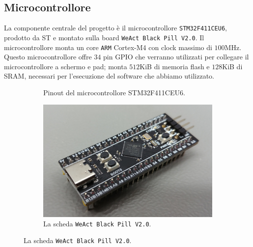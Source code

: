 \documentclass[hidelinks,12pt]{article}
\begin{document}
\subsection{Microcontrollore}
La componente centrale del progetto è il microcontrollore
\texttt{STM32F411CEU6}, prodotto da ST e montato sulla board
\texttt{WeAct Black Pill V2.0}.
Il microcontrollore monta un core \texttt{ARM} Cortex-M4 con clock
massimo di $100$MHz. Questo microcontrollore offre $34$ pin GPIO che verranno
utilizzati per collegare il microcontrollore a schermo e pad; monta $512$KiB di
memoria flash e $128$KiB di SRAM, necessari per l'esecuzione del software
che abbiamo utilizzato.
\begin{figure}
	\begin{subfigure}[b]{0.45\textwidth}
		\begin{center}
			\begin{tikzpicture}[x=0.015cm, y=0.015cm, scale=0.5, transform shape]
				
			\end{tikzpicture}
		\end{center}
		\caption{Pinout del microcontrollore STM32F411CEU6.}
		\label{fig:pinout_stm32}
	\end{subfigure}
	\hfill
	\begin{subfigure}[b]{0.45\textwidth}
		\begin{center}
			\includegraphics[scale=0.5]{figures/stm32.jpg}
		\end{center}
		\caption{La scheda \texttt{WeAct Black Pill V2.0}.}
		\label{fig:weact_blackpill}
	\end{subfigure}
\end{figure}
\end{document}
